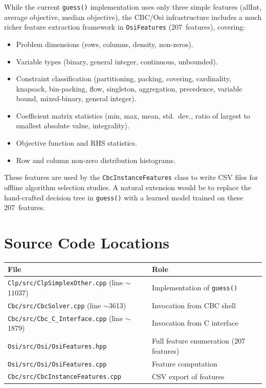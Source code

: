 \documentclass[11pt,a4paper]{article}
\begin{document}
While the current \texttt{guess()} implementation uses only three simple
features (allInt, average objective, median objective), the CBC/Osi
infrastructure includes a much richer feature extraction framework in
\texttt{OsiFeatures} (207~features), covering:

\begin{itemize}
  \item Problem dimensions (rows, columns, density, non-zeros).
  \item Variable types (binary, general integer, continuous, unbounded).
  \item Constraint classification (partitioning, packing, covering,
        cardinality, knapsack, bin-packing, flow, singleton, aggregation,
        precedence, variable bound, mixed-binary, general integer).
  \item Coefficient matrix statistics (min, max, mean, std.\ dev., ratio
        of largest to smallest absolute value, integrality).
  \item Objective function and RHS statistics.
  \item Row and column non-zero distribution histograms.
\end{itemize}

These features are used by the \texttt{CbcInstanceFeatures} class to write
CSV files for offline algorithm selection studies.  A natural extension would
be to replace the hand-crafted decision tree in \texttt{guess()} with a
learned model trained on these 207~features.

\section{Source Code Locations}

\begin{table}[htbp]
\centering
\begin{tabular}{@{}lp{8cm}@{}}
\toprule
\textbf{File} & \textbf{Role} \\
\midrule
\texttt{Clp/src/ClpSimplexOther.cpp} (line $\sim$11037) &
  Implementation of \texttt{guess()} \\
\texttt{Cbc/src/CbcSolver.cpp} (line $\sim$3613) &
  Invocation from CBC shell \\
\texttt{Cbc/src/Cbc\_C\_Interface.cpp} (line $\sim$1879) &
  Invocation from C interface \\
\texttt{Osi/src/Osi/OsiFeatures.hpp} &
  Full feature enumeration (207 features) \\
\texttt{Osi/src/Osi/OsiFeatures.cpp} &
  Feature computation \\
\texttt{Cbc/src/CbcInstanceFeatures.cpp} &
  CSV export of features \\
\bottomrule
\end{tabular}
\end{table}
\end{document}
